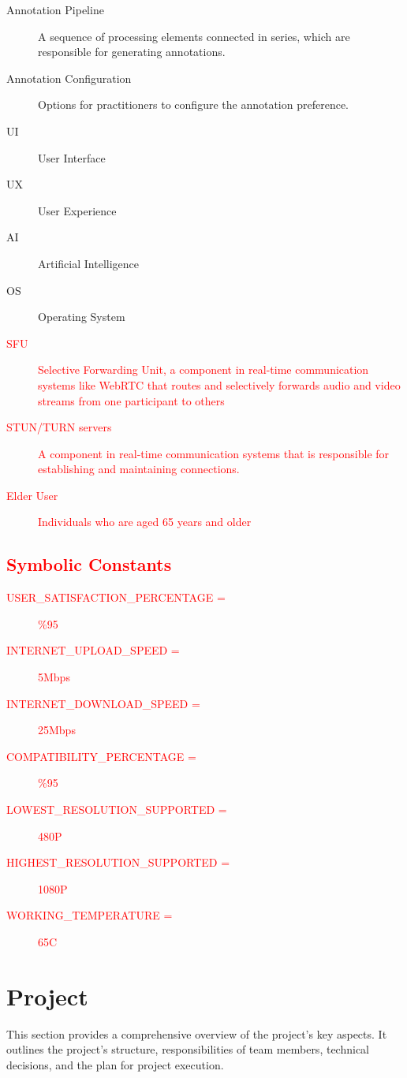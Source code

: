 \documentclass[12pt]{article}
\begin{document}
\begin{description}
    \item[Annotation Pipeline] A sequence of processing elements connected in series, which are responsible for generating annotations.
    \item[Annotation Configuration] Options for practitioners to configure the annotation preference.
    \item[UI] User Interface
    \item[UX] User Experience
    \item[AI] Artificial Intelligence
    \item[OS] Operating System
    \item[\textcolor{red}{SFU}] \textcolor{red}{Selective Forwarding Unit, a component in real-time communication systems like WebRTC
    that routes and selectively forwards audio and video streams from one participant to others}
    \item[\textcolor{red}{STUN/TURN servers}] \textcolor{red}{A component in real-time communication systems that is responsible for
    establishing and maintaining connections.}
    \item[\textcolor{red}{Elder User}] \textcolor{red}{Individuals who are aged 65 years and older}
\end{description}

\subsection{\textcolor{red}{Symbolic Constants}}\label{sec:symbolic-constants}
\begin{description}
    \item[\textcolor{red}{USER\_SATISFACTION\_PERCENTAGE =}] \textcolor{red}{\%95}
    \item[\textcolor{red}{INTERNET\_UPLOAD\_SPEED =}] \textcolor{red}{5Mbps} 
    \item[\textcolor{red}{INTERNET\_DOWNLOAD\_SPEED =}] \textcolor{red}{25Mbps} 
    \item[\textcolor{red}{COMPATIBILITY\_PERCENTAGE =}] \textcolor{red}{\%95}
    \item[\textcolor{red}{LOWEST\_RESOLUTION\_SUPPORTED =}] \textcolor{red}{480P}
    \item[\textcolor{red}{HIGHEST\_RESOLUTION\_SUPPORTED =}] \textcolor{red}{1080P}
    \item[\textcolor{red}{WORKING\_TEMPERATURE =}] \textcolor{red}{65\degree C}
\end{description}

\section{Project}
This section provides a comprehensive overview of the project’s key aspects. It outlines the project’s structure, responsibilities of team members, technical decisions, and the plan for project execution.
\end{document}
